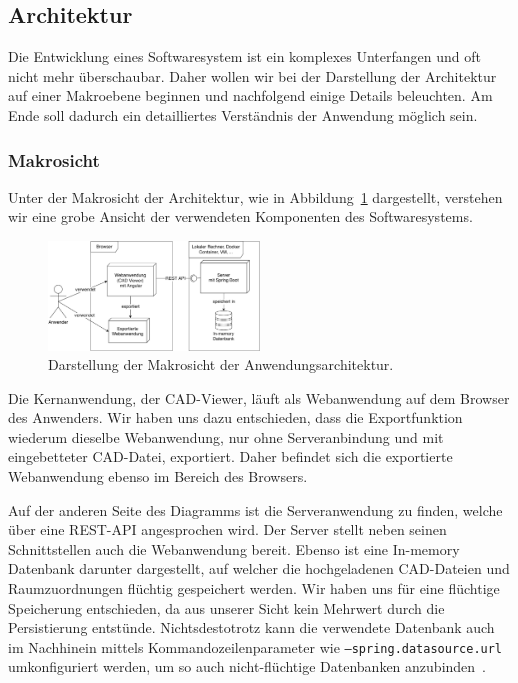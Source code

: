 \subsection{Architektur}
\label{subsec:architecture}

Die Entwicklung eines Softwaresystem ist ein komplexes Unterfangen und oft nicht mehr überschaubar.
Daher wollen wir bei der Darstellung der Architektur auf einer Makroebene beginnen und nachfolgend einige Details beleuchten.
Am Ende soll dadurch ein detailliertes Verständnis der Anwendung möglich sein.

\subsubsection{Makrosicht}
\label{subsubsec:macro-view}

Unter der Makrosicht der Architektur, wie in Abbildung~\ref{fig:macro-view-diagram} dargestellt, verstehen wir eine grobe Ansicht der verwendeten Komponenten des Softwaresystems.

\begin{figure}[h]
    \includegraphics[width=0.5\textwidth]{res/macro.pdf}
    \caption{Darstellung der Makrosicht der Anwendungsarchitektur.}
    \label{fig:macro-view-diagram}
\end{figure}

Die Kernanwendung, der CAD-Viewer, läuft als Webanwendung auf dem Browser des Anwenders.
Wir haben uns dazu entschieden, dass die Exportfunktion wiederum dieselbe Webanwendung, nur ohne Serveranbindung und mit eingebetteter CAD-Datei, exportiert.
Daher befindet sich die exportierte Webanwendung ebenso im Bereich des Browsers.

Auf der anderen Seite des Diagramms ist die Serveranwendung zu finden, welche über eine REST-API angesprochen wird.
Der Server stellt neben seinen Schnittstellen auch die Webanwendung bereit.
Ebenso ist eine In-memory Datenbank darunter dargestellt, auf welcher die hochgeladenen CAD-Dateien und Raumzuordnungen flüchtig gespeichert werden.
Wir haben uns für eine flüchtige Speicherung entschieden, da aus unserer Sicht kein Mehrwert durch die Persistierung entstünde.
Nichtsdestotrotz kann die verwendete Datenbank auch im Nachhinein mittels Kommandozeilenparameter wie \texttt{--spring.datasource.url} umkonfiguriert werden, um so auch nicht-flüchtige Datenbanken anzubinden~\cite{JDBCSpringBoot}.

